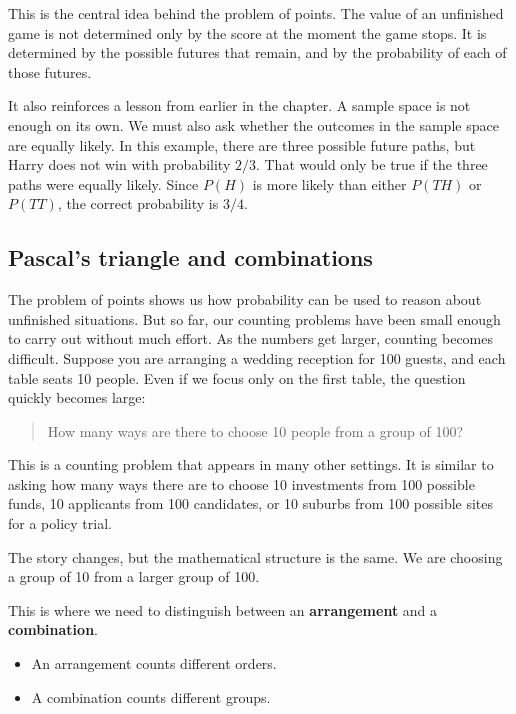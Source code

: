 \documentclass[
  letterpaper,
  DIV=11,
  numbers=noendperiod]{scrreprt}
\providecommand{\tightlist}{%
  \setlength{\itemsep}{0pt}\setlength{\parskip}{0pt}}
\begin{document}
\begin{tcolorbox}
This is the central idea behind the problem of points. The value of an
unfinished game is not determined only by the score at the moment the
game stops. It is determined by the possible futures that remain, and by
the probability of each of those futures.

It also reinforces a lesson from earlier in the chapter. A sample space
is not enough on its own. We must also ask whether the outcomes in the
sample space are equally likely. In this example, there are three
possible future paths, but Harry does not win with probability \(2/3\).
That would only be true if the three paths were equally likely. Since
\(P(H)\) is more likely than either \(P(TH)\) or \(P(TT)\), the correct
probability is \(3/4\).

\end{tcolorbox}

\subsection{Pascal's triangle and
combinations}\label{pascals-triangle-and-combinations}

The problem of points shows us how probability can be used to reason
about unfinished situations. But so far, our counting problems have been
small enough to carry out without much effort. As the numbers get
larger, counting becomes difficult. Suppose you are arranging a wedding
reception for 100 guests, and each table seats 10 people. Even if we
focus only on the first table, the question quickly becomes large:

\begin{quote}
How many ways are there to choose 10 people from a group of 100?
\end{quote}

This is a counting problem that appears in many other settings. It is
similar to asking how many ways there are to choose 10 investments from
100 possible funds, 10 applicants from 100 candidates, or 10 suburbs
from 100 possible sites for a policy trial.

The story changes, but the mathematical structure is the same. We are
choosing a group of 10 from a larger group of 100.

This is where we need to distinguish between an \textbf{arrangement} and
a \textbf{combination}.

\begin{itemize}
\tightlist
\item
  An arrangement counts different orders.
\item
  A combination counts different groups.
\end{itemize}
\end{document}
